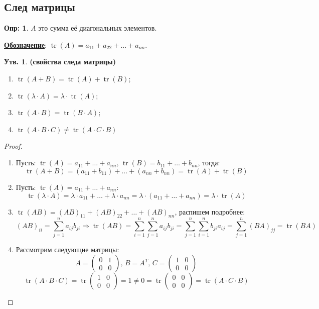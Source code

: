 \documentclass[12pt]{article}
\theoremstyle{definition}
\newtheorem{defn}{Опр:}
\newtheorem{prop}{Утв.}
\newcommand{\ddsum}[2]{\displaystyle\sum\limits_{#1}^{#2}}
\DeclareMathOperator*{\tr}{tr}
\begin{document}
\subsection*{След матрицы}
\begin{defn}
	 $A$ это сумма её диагональных элементов.
	
	\textbf{\uline{Обозначение}}: $\tr{(A)} = a_{11} + a_{22} + \dotsc + a_{nn}$.
\end{defn}
\begin{prop}\textbf{(свойства следа матрицы)}
	\begin{enumerate}[label = \arabic*)]
		\item $\tr{(A+B)} = \tr{(A)} + \tr{(B)}$;
		\item $\tr{(\lambda{\cdot}A)} = \lambda{\cdot}\tr{(A)}$;
		\item $\tr{(A{\cdot}B)} = \tr{(B{\cdot}A)}$;
		\item $\tr{(A{\cdot}B{\cdot}C)} \neq \tr{(A{\cdot}C{\cdot}B)}$
	\end{enumerate}
\end{prop}
\begin{proof}\hfill	
	\begin{enumerate}[label = \arabic*)]
		\item Пусть: $\tr{(A)} = a_{11} + \dotsc + a_{nn}, \, \tr{(B)} = b_{11} + \dotsc + b_{nn}$, тогда: 
		$$
			\tr{(A+B)} = (a_{11} + b_{11}) + \dotsc + (a_{nn} + b_{nn}) = \tr{(A)} + \tr{(B)}
		$$
		\item Пусть: $\tr{(A)} = a_{11} + \dotsc + a_{nn}$:
		$$
			\tr{(\lambda{\cdot}A)} = \lambda{\cdot}a_{11} + \dotsc + \lambda{\cdot}a_{nn} = \lambda{\cdot}(a_{11} + \dotsc + a_{nn}) = \lambda{\cdot}\tr{(A)}
		$$
		\item $\tr{(AB)} = (AB)_{11} + (AB)_{22} + \dotsc + (AB)_{nn}$, распишем подробнее:
		$$
			(AB)_{ii} = \ddsum{j = 1}{n}a_{ij}b_{ji} \Rightarrow \tr{(AB)} = \ddsum{i = 1}{n} \ddsum{j = 1}{n}a_{ij}b_{ji} = \ddsum{j = 1}{n}\ddsum{i = 1}{n}b_{ji}a_{ij} = \ddsum{j = 1}{n}(BA)_{jj} = \tr{(BA)}
		$$
		\item Рассмотрим следующие матрицы:
		$$
			A = 
			\begin{pmatrix}
				0 & 1 \\
				0 & 0
			\end{pmatrix}, \, B = A^T, \,
			C = 
			\begin{pmatrix}
				1 & 0 \\
				0 & 0
			\end{pmatrix}
		$$
		$$
			\tr{(A{\cdot}B{\cdot}C)} =
			\tr{
				\begin{pmatrix}
					1 & 0\\
					0 & 0
				\end{pmatrix}
				} = 1 \neq 0 = 
			\tr{
			\begin{pmatrix}
				0 & 0\\
				0 & 0
			\end{pmatrix}} = \tr{(A{\cdot}C{\cdot}B)}
		$$
	\end{enumerate}
\end{proof}
\end{document}

